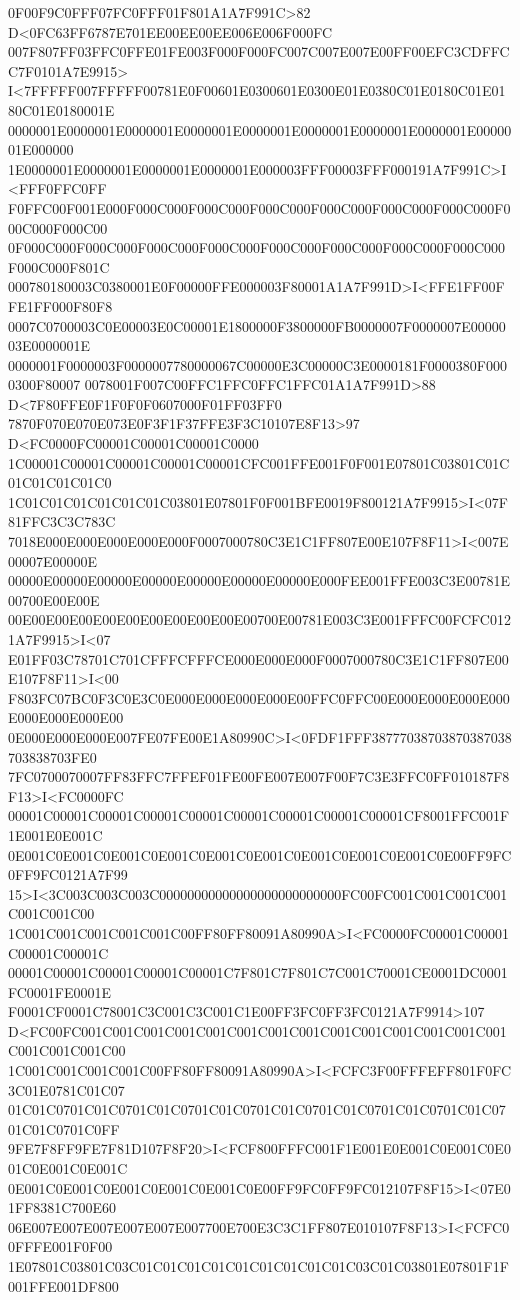 0F00F9C0FFF07FC0FFF01F801A1A7F991C>82 D<0FC63FF6787E701EE00EE00EE006E006F000FC
007F807FF03FFC0FFE01FE003F000F000FC007C007E007E00FF00EFC3CDFFCC7F0101A7E9915>
I<7FFFFF007FFFFF00781E0F00601E0300601E0300E01E0380C01E0180C01E0180C01E0180001E
0000001E0000001E0000001E0000001E0000001E0000001E0000001E0000001E0000001E000000
1E0000001E0000001E0000001E0000001E000003FFF00003FFF000191A7F991C>I<FFF0FFC0FF
F0FFC00F001E000F000C000F000C000F000C000F000C000F000C000F000C000F000C000F000C00
0F000C000F000C000F000C000F000C000F000C000F000C000F000C000F000C000F000C000F801C
000780180003C0380001E0F00000FFE000003F80001A1A7F991D>I<FFE1FF00FFE1FF000F80F8
0007C0700003C0E00003E0C00001E1800000F3800000FB0000007F0000007E0000003E0000001E
0000001F0000003F0000007780000067C00000E3C00000C3E0000181F0000380F0000300F80007
0078001F007C00FFC1FFC0FFC1FFC01A1A7F991D>88 D<7F80FFE0F1F0F0F0607000F01FF03FF0
7870F070E070E073E0F3F1F37FFE3F3C10107E8F13>97 D<FC0000FC00001C00001C00001C0000
1C00001C00001C00001C00001C00001CFC001FFE001F0F001E07801C03801C01C01C01C01C01C0
1C01C01C01C01C01C01C03801E07801F0F001BFE0019F800121A7F9915>I<07F81FFC3C3C783C
7018E000E000E000E000E000F0007000780C3E1C1FF807E00E107F8F11>I<007E00007E00000E
00000E00000E00000E00000E00000E00000E00000E000FEE001FFE003C3E00781E00700E00E00E
00E00E00E00E00E00E00E00E00E00E00700E00781E003C3E001FFFC00FCFC0121A7F9915>I<07
E01FF03C78701C701CFFFCFFFCE000E000E000F0007000780C3E1C1FF807E00E107F8F11>I<00
F803FC07BC0F3C0E3C0E000E000E000E000E00FFC0FFC00E000E000E000E000E000E000E000E00
0E000E000E000E007FE07FE00E1A80990C>I<0FDF1FFF38777038703870387038703838703FE0
7FC0700070007FF83FFC7FFEF01FE00FE007E007F00F7C3E3FFC0FF010187F8F13>I<FC0000FC
00001C00001C00001C00001C00001C00001C00001C00001C00001CF8001FFC001F1E001E0E001C
0E001C0E001C0E001C0E001C0E001C0E001C0E001C0E001C0E001C0E00FF9FC0FF9FC0121A7F99
15>I<3C003C003C003C00000000000000000000000000FC00FC001C001C001C001C001C001C00
1C001C001C001C001C001C00FF80FF80091A80990A>I<FC0000FC00001C00001C00001C00001C
00001C00001C00001C00001C00001C7F801C7F801C7C001C70001CE0001DC0001FC0001FE0001E
F0001CF0001C78001C3C001C3C001C1E00FF3FC0FF3FC0121A7F9914>107
D<FC00FC001C001C001C001C001C001C001C001C001C001C001C001C001C001C001C001C001C00
1C001C001C001C001C00FF80FF80091A80990A>I<FCFC3F00FFFEFF801F0FC3C01E0781C01C07
01C01C0701C01C0701C01C0701C01C0701C01C0701C01C0701C01C0701C01C0701C01C0701C0FF
9FE7F8FF9FE7F81D107F8F20>I<FCF800FFFC001F1E001E0E001C0E001C0E001C0E001C0E001C
0E001C0E001C0E001C0E001C0E001C0E00FF9FC0FF9FC012107F8F15>I<07E01FF8381C700E60
06E007E007E007E007E007E007700E700E3C3C1FF807E010107F8F13>I<FCFC00FFFE001F0F00
1E07801C03801C03C01C01C01C01C01C01C01C01C01C03C01C03801E07801F1F001FFE001DF800
